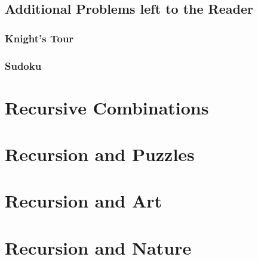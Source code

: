 \subsection{Additional Problems left to the Reader}

\subsubsection{Knight's Tour}

\subsubsection{Sudoku}




\section{Recursive Combinations}



\section{Recursion and Puzzles}



\section{Recursion and Art}

\section{Recursion and Nature}
